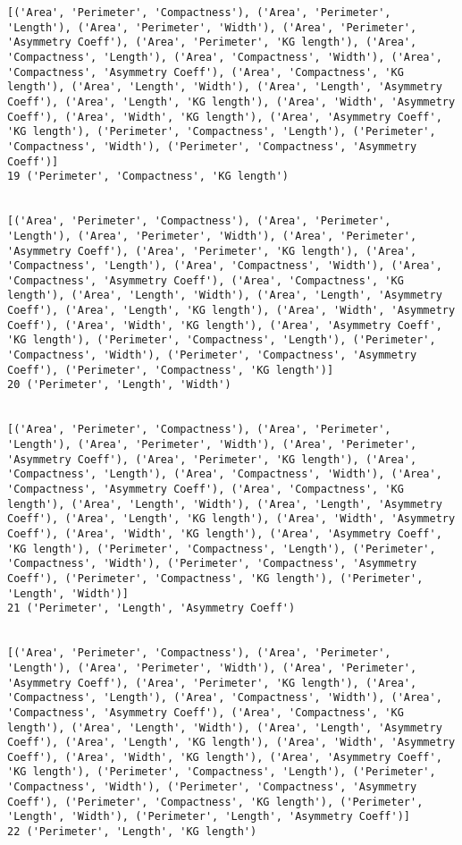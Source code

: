 \documentclass[11pt]{article}
\begin{document}
\begin{Verbatim}[commandchars=\\\{\}]
[('Area', 'Perimeter', 'Compactness'), ('Area', 'Perimeter', 'Length'), ('Area', 'Perimeter', 'Width'), ('Area', 'Perimeter', 'Asymmetry Coeff'), ('Area', 'Perimeter', 'KG length'), ('Area', 'Compactness', 'Length'), ('Area', 'Compactness', 'Width'), ('Area', 'Compactness', 'Asymmetry Coeff'), ('Area', 'Compactness', 'KG length'), ('Area', 'Length', 'Width'), ('Area', 'Length', 'Asymmetry Coeff'), ('Area', 'Length', 'KG length'), ('Area', 'Width', 'Asymmetry Coeff'), ('Area', 'Width', 'KG length'), ('Area', 'Asymmetry Coeff', 'KG length'), ('Perimeter', 'Compactness', 'Length'), ('Perimeter', 'Compactness', 'Width'), ('Perimeter', 'Compactness', 'Asymmetry Coeff')]
19 ('Perimeter', 'Compactness', 'KG length')


[('Area', 'Perimeter', 'Compactness'), ('Area', 'Perimeter', 'Length'), ('Area', 'Perimeter', 'Width'), ('Area', 'Perimeter', 'Asymmetry Coeff'), ('Area', 'Perimeter', 'KG length'), ('Area', 'Compactness', 'Length'), ('Area', 'Compactness', 'Width'), ('Area', 'Compactness', 'Asymmetry Coeff'), ('Area', 'Compactness', 'KG length'), ('Area', 'Length', 'Width'), ('Area', 'Length', 'Asymmetry Coeff'), ('Area', 'Length', 'KG length'), ('Area', 'Width', 'Asymmetry Coeff'), ('Area', 'Width', 'KG length'), ('Area', 'Asymmetry Coeff', 'KG length'), ('Perimeter', 'Compactness', 'Length'), ('Perimeter', 'Compactness', 'Width'), ('Perimeter', 'Compactness', 'Asymmetry Coeff'), ('Perimeter', 'Compactness', 'KG length')]
20 ('Perimeter', 'Length', 'Width')


[('Area', 'Perimeter', 'Compactness'), ('Area', 'Perimeter', 'Length'), ('Area', 'Perimeter', 'Width'), ('Area', 'Perimeter', 'Asymmetry Coeff'), ('Area', 'Perimeter', 'KG length'), ('Area', 'Compactness', 'Length'), ('Area', 'Compactness', 'Width'), ('Area', 'Compactness', 'Asymmetry Coeff'), ('Area', 'Compactness', 'KG length'), ('Area', 'Length', 'Width'), ('Area', 'Length', 'Asymmetry Coeff'), ('Area', 'Length', 'KG length'), ('Area', 'Width', 'Asymmetry Coeff'), ('Area', 'Width', 'KG length'), ('Area', 'Asymmetry Coeff', 'KG length'), ('Perimeter', 'Compactness', 'Length'), ('Perimeter', 'Compactness', 'Width'), ('Perimeter', 'Compactness', 'Asymmetry Coeff'), ('Perimeter', 'Compactness', 'KG length'), ('Perimeter', 'Length', 'Width')]
21 ('Perimeter', 'Length', 'Asymmetry Coeff')


[('Area', 'Perimeter', 'Compactness'), ('Area', 'Perimeter', 'Length'), ('Area', 'Perimeter', 'Width'), ('Area', 'Perimeter', 'Asymmetry Coeff'), ('Area', 'Perimeter', 'KG length'), ('Area', 'Compactness', 'Length'), ('Area', 'Compactness', 'Width'), ('Area', 'Compactness', 'Asymmetry Coeff'), ('Area', 'Compactness', 'KG length'), ('Area', 'Length', 'Width'), ('Area', 'Length', 'Asymmetry Coeff'), ('Area', 'Length', 'KG length'), ('Area', 'Width', 'Asymmetry Coeff'), ('Area', 'Width', 'KG length'), ('Area', 'Asymmetry Coeff', 'KG length'), ('Perimeter', 'Compactness', 'Length'), ('Perimeter', 'Compactness', 'Width'), ('Perimeter', 'Compactness', 'Asymmetry Coeff'), ('Perimeter', 'Compactness', 'KG length'), ('Perimeter', 'Length', 'Width'), ('Perimeter', 'Length', 'Asymmetry Coeff')]
22 ('Perimeter', 'Length', 'KG length')



\end{Verbatim}
\end{document}
